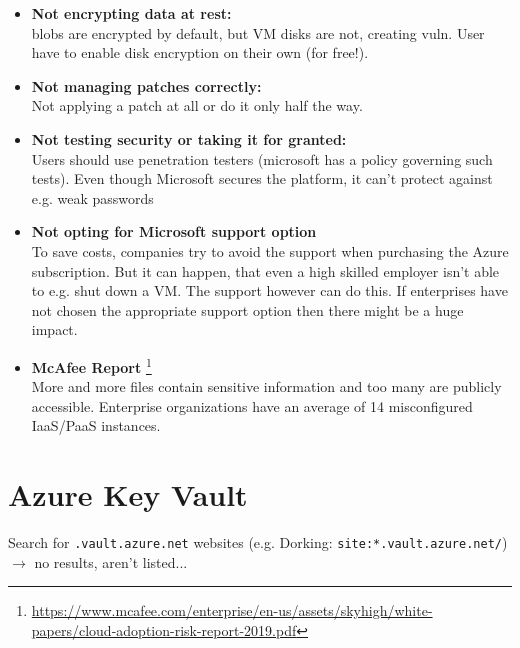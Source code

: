 \documentclass[12pt]{article}
\begin{document}
\begin{itemize}
    \item \textbf{Not encrypting data at rest:} \footnotemark[3] \\ 
    blobs are encrypted by default, but VM disks are not, creating vuln. User have to enable disk encryption on their own (for free!).
    
    \item \textbf{Not managing patches correctly:} \footnotemark[4] \\
    Not applying a patch at all or do it only half the way.
    
    \item \textbf{Not testing security or taking it for granted:} \footnotemark[4] \footnotemark[1] \\ 
    Users should use penetration testers (microsoft has a policy governing such tests).
    Even though Microsoft secures the platform, it can't protect against e.g. weak passwords
    
    \item \textbf{Not opting for Microsoft support option} \footnotemark[1] \\
    To save costs, companies try to avoid the support when purchasing the Azure subscription. 
    But it can happen, that even a high skilled employer isn't able to e.g. shut down a VM. The support however can do this. If enterprises have not chosen the appropriate support option then there might be a huge impact. 
    
    \item \textbf{McAfee Report} \footnote{\url{https://www.mcafee.com/enterprise/en-us/assets/skyhigh/white-papers/cloud-adoption-risk-report-2019.pdf}} \\
    More and more files contain sensitive information and too many are publicly accessible. Enterprise organizations have an average of 14 misconfigured IaaS/PaaS instances.
    
\end{itemize}


\newpage
\section*{Azure Key Vault}


Search for \verb|.vault.azure.net| websites (e.g. Dorking: \verb|site:*.vault.azure.net/|)\\
$\rightarrow$ no results, aren't listed...
\end{document}
